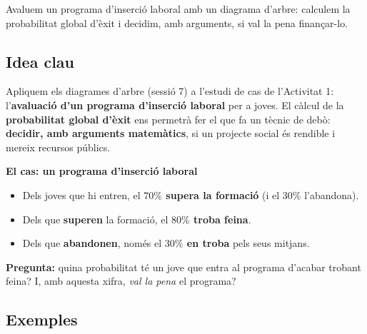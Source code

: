 %
{Avaluem un programa d'inserció laboral amb un diagrama d'arbre: calculem la probabilitat global d'èxit i decidim, amb arguments, si val la pena finançar-lo.}

\subsection{Idea clau}

Apliquem els diagrames d'arbre (sessió 7) a l'estudi de cas de l'Activitat 1:
l'\textbf{avaluació d'un programa d'inserció laboral} per a joves. El càlcul de la
\textbf{probabilitat global d'èxit} ens permetrà fer el que fa un tècnic de debò:
\textbf{decidir, amb arguments matemàtics}, si un projecte social és rendible i mereix
recursos públics.

\begin{idea}
\textbf{El cas: un programa d'inserció laboral}
\begin{itemize}[leftmargin=1.4em, itemsep=2pt]
  \item Dels joves que hi entren, el \textbf{$70\%$ supera la formació} (i el $30\%$
        l'abandona).
  \item Dels que \textbf{superen} la formació, el \textbf{$80\%$ troba feina}.
  \item Dels que \textbf{abandonen}, només el \textbf{$30\%$ en troba} pels seus
        mitjans.
\end{itemize}
\textbf{Pregunta:} quina probabilitat té un jove que entra al programa d'acabar trobant
feina? I, amb aquesta xifra, \emph{val la pena} el programa?
\end{idea}

\subsection{Exemples}


